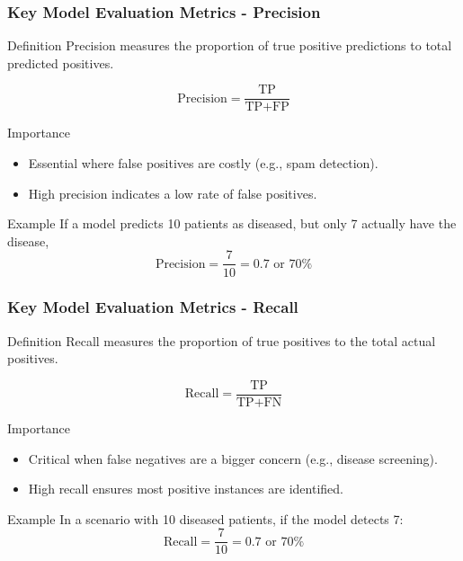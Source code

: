 \documentclass[aspectratio=169]{beamer}
\begin{document}
\begin{frame}[fragile]
    \frametitle{Key Model Evaluation Metrics - Precision}
    \begin{block}{Definition}
        Precision measures the proportion of true positive predictions to total predicted positives.
    \end{block}
    
    \begin{equation}
        \text{Precision} = \frac{\text{TP}}{\text{TP} + \text{FP}}
    \end{equation}

    \begin{block}{Importance}
        \begin{itemize}
            \item Essential where false positives are costly (e.g., spam detection).
            \item High precision indicates a low rate of false positives.
        \end{itemize}
    \end{block}
    
    \begin{block}{Example}
        If a model predicts 10 patients as diseased, but only 7 actually have the disease,
        \[
        \text{Precision} = \frac{7}{10} = 0.7 \text{ or } 70\%
        \]
    \end{block}
\end{frame}

\begin{frame}[fragile]
    \frametitle{Key Model Evaluation Metrics - Recall}
    \begin{block}{Definition}
        Recall measures the proportion of true positives to the total actual positives.
    \end{block}
    
    \begin{equation}
        \text{Recall} = \frac{\text{TP}}{\text{TP} + \text{FN}}
    \end{equation}

    \begin{block}{Importance}
        \begin{itemize}
            \item Critical when false negatives are a bigger concern (e.g., disease screening).
            \item High recall ensures most positive instances are identified.
        \end{itemize}
    \end{block}
    
    \begin{block}{Example}
        In a scenario with 10 diseased patients, if the model detects 7:
        \[
        \text{Recall} = \frac{7}{10} = 0.7 \text{ or } 70\%
        \]
    \end{block}
\end{frame}
\end{document}
